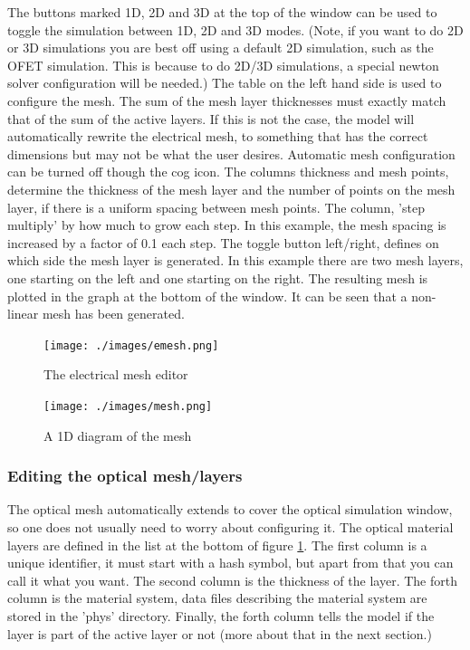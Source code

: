 \documentclass[11pt]{article}
\begin{document}
The buttons marked 1D, 2D and 3D at the top of the window can be used to toggle the simulation between 1D, 2D and 3D modes.  (Note, if you want to do 2D or 3D simulations you are best off using a default 2D simulation, such as the OFET simulation.  This is because to do 2D/3D simulations, a special newton solver configuration will be needed.) The table on the left hand side is used to configure the mesh.  The sum of the mesh layer thicknesses must exactly match that of the sum of the active layers.  If this is not the case, the model will automatically rewrite the electrical mesh, to something that has the correct dimensions but may not be what the user desires.  Automatic mesh configuration can be turned off though the cog icon.  The columns thickness and mesh points, determine the thickness of the mesh layer and the number of points on the mesh layer, if there is a uniform spacing between mesh points.  The column, 'step multiply' by how much to grow each step.  In this example, the mesh spacing is increased by a factor of 0.1 each step.  The toggle button left/right, defines on which side the mesh layer is generated.  In this example there are two mesh layers, one starting on the left and one starting on the right.  The resulting mesh is plotted in the graph at the bottom of the window.  It can be seen that a non-linear mesh has been generated.

\begin{figure}[ht!]
\centering
\texttt{[image: ./images/emesh.png]}
\caption{The electrical mesh editor}
\label{fig:emesh}
\end{figure}

\begin{figure}[ht!]
\centering
\texttt{[image: ./images/mesh.png]}
\caption{A 1D diagram of the mesh}
\label{fig:emeshdiagram}
\end{figure}


\subsubsection{Editing the optical mesh/layers}
The optical mesh automatically extends to cover the optical simulation window, so one does not usually need to worry about configuring it.  The optical material layers are defined in the list at the bottom of figure \ref{fig:emesh}.  The first column is a unique identifier, it must start with a hash symbol, but apart from that you can call it what you want.  The second column is the thickness of the layer.  The forth column is the material system, data files describing the material system are stored in the 'phys' directory.  Finally, the forth column tells the model if the layer is part of the active layer or not (more about that in the next section.)
\end{document}
